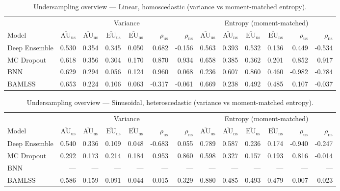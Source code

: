 \begin{table}[htbp]
\centering
\small
\caption{Undersampling overview --- Linear, homoscedastic (variance vs moment-matched entropy).}
\begin{tabular}{l*{12}{r}}
\toprule
 & \multicolumn{6}{c}{Variance} & \multicolumn{6}{c}{Entropy (moment-matched)} \\
\cmidrule(lr){2-7}\cmidrule(lr){8-13}
Model & $\overline{\mathrm{AU}}_{\mathrm{us}}$ & $\overline{\mathrm{AU}}_{\mathrm{ns}}$ & $\overline{\mathrm{EU}}_{\mathrm{us}}$ & $\overline{\mathrm{EU}}_{\mathrm{ns}}$ & $\rho_{\mathrm{us}}$ & $\rho_{\mathrm{ns}}$ & $\overline{\mathrm{AU}}_{\mathrm{us}}$ & $\overline{\mathrm{AU}}_{\mathrm{ns}}$ & $\overline{\mathrm{EU}}_{\mathrm{us}}$ & $\overline{\mathrm{EU}}_{\mathrm{ns}}$ & $\rho_{\mathrm{us}}$ & $\rho_{\mathrm{ns}}$ \\
\midrule
Deep Ensemble & 0.530 & 0.354 & 0.345 & 0.050 & 0.682 & -0.156 & 0.563 & 0.393 & 0.532 & 0.136 & 0.449 & -0.534 \\
MC Dropout & 0.618 & 0.356 & 0.304 & 0.170 & 0.870 & 0.934 & 0.658 & 0.385 & 0.362 & 0.201 & 0.852 & 0.917 \\
BNN & 0.629 & 0.294 & 0.056 & 0.124 & 0.960 & 0.068 & 0.236 & 0.607 & 0.860 & 0.460 & -0.982 & -0.784 \\
BAMLSS & 0.653 & 0.224 & 0.106 & 0.063 & -0.317 & -0.061 & 0.669 & 0.238 & 0.492 & 0.485 & 0.107 & -0.037 \\
\bottomrule
\end{tabular}
\end{table}



\begin{table}[htbp]
\centering
\small
\caption{Undersampling overview --- Sinusoidal, heteroscedastic (variance vs moment-matched entropy).}
\begin{tabular}{l*{12}{r}}
\toprule
 & \multicolumn{6}{c}{Variance} & \multicolumn{6}{c}{Entropy (moment-matched)} \\
\cmidrule(lr){2-7}\cmidrule(lr){8-13}
Model & $\overline{\mathrm{AU}}_{\mathrm{us}}$ & $\overline{\mathrm{AU}}_{\mathrm{ns}}$ & $\overline{\mathrm{EU}}_{\mathrm{us}}$ & $\overline{\mathrm{EU}}_{\mathrm{ns}}$ & $\rho_{\mathrm{us}}$ & $\rho_{\mathrm{ns}}$ & $\overline{\mathrm{AU}}_{\mathrm{us}}$ & $\overline{\mathrm{AU}}_{\mathrm{ns}}$ & $\overline{\mathrm{EU}}_{\mathrm{us}}$ & $\overline{\mathrm{EU}}_{\mathrm{ns}}$ & $\rho_{\mathrm{us}}$ & $\rho_{\mathrm{ns}}$ \\
\midrule
Deep Ensemble & 0.540 & 0.336 & 0.109 & 0.048 & -0.683 & 0.055 & 0.789 & 0.587 & 0.236 & 0.174 & -0.940 & -0.247 \\
MC Dropout & 0.292 & 0.173 & 0.214 & 0.184 & 0.953 & 0.860 & 0.598 & 0.327 & 0.157 & 0.193 & 0.816 & -0.014 \\
BNN & --- & --- & --- & --- & --- & --- & --- & --- & --- & --- & --- & --- \\
BAMLSS & 0.586 & 0.159 & 0.091 & 0.044 & -0.015 & -0.329 & 0.880 & 0.485 & 0.493 & 0.479 & -0.007 & -0.023 \\
\bottomrule
\end{tabular}
\end{table}



